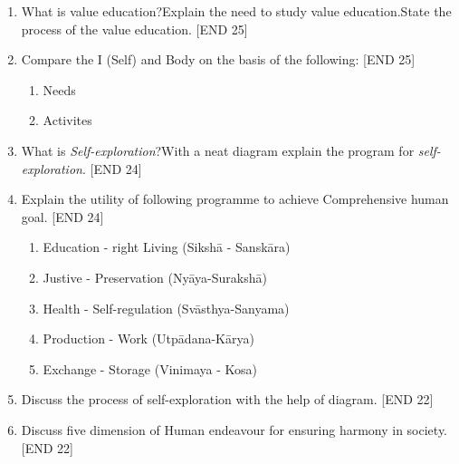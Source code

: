 \documentclass[12pt]{article}
\begin{document}
\begin{enumerate}
		\item What is value education?Explain the need to study value education.State the process of the value education. \hfill{[END 25]}
		
		\item Compare the I (Self) and Body on the basis of the following: \hfill{[END 25]}
		\begin{enumerate}
			\item Needs
			\item Activites
		\end{enumerate}
		
		\item What is \textit{Self-exploration}?With a neat diagram explain the program for \textit{self-exploration}. \hfill{[END 24]}
		
		\item Explain the utility of following programme to achieve Comprehensive human goal. \hfill{[END 24]}
		\begin{enumerate}
			\item Education - right Living (Sikshā - Sanskāra)
			\item Justive - Preservation (Nyāya-Surakshā)
			\item Health - Self-regulation (Svāsthya-Sanyama)
			\item Production - Work (Utpādana-Kārya)
			\item Exchange - Storage (Vinimaya - Kosa)
		\end{enumerate}
		
		\item Discuss the process of self-exploration with the help of diagram. \hfill{[END 22]}
		
		\item Discuss five dimension of Human endeavour for ensuring harmony in society. \hfill{[END 22]}
	\end{enumerate}
\end{document}

